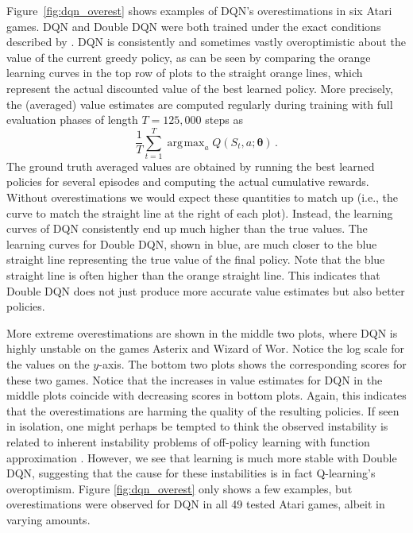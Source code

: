 \documentclass[letterpaper]{article}
\def\th{\bm\theta}
\DeclareMathOperator*{\argmax}{\arg\!\max}
\begin{document}
Figure~\ref{fig:dqn_overest} shows examples of DQN's overestimations in six Atari games. DQN and Double DQN were both trained under the exact conditions described by \citet{Mnih:2015}.  DQN is consistently and sometimes vastly overoptimistic about the value of the current greedy policy, as can be seen by comparing the orange learning curves in the top row of plots to the straight orange lines, which represent the actual discounted value of the best learned policy.  
More precisely, the (averaged) value estimates are computed regularly during training with full evaluation phases of length $T=125,000$ steps as
\[
\frac{1}{T} \sum_{t=1}^T \argmax_a Q( S_{t}, a ; \th) \,.
\]The ground truth averaged values are obtained by running the best learned policies for several episodes and computing the actual cumulative rewards.      
Without overestimations we would expect these quantities to match up (i.e., the curve to match the straight line at the right of each plot).  Instead, the learning curves of DQN consistently end up much higher than the true values.  The learning curves for Double DQN, shown in blue, are much closer to the blue straight line representing the true value of the final policy.  Note that the blue straight line is often higher than the orange straight line.  This indicates that Double DQN does not just produce more accurate value estimates but also better policies.

More extreme overestimations are shown in the middle two plots, where DQN is highly unstable on the games Asterix and Wizard of Wor.  Notice the log scale for the values on the $y$-axis.  The bottom two plots shows the corresponding scores for these two games.  Notice that the increases in value estimates for DQN in the middle plots coincide with decreasing scores in bottom plots.  Again, this indicates that the overestimations are harming the quality of the resulting policies.
If seen in isolation, one might perhaps be tempted to think the observed instability is related to inherent instability problems of off-policy learning with function approximation \citep{Baird:1995,Tsitsiklis:1997,Sutton:2008,Maei:2011,Sutton:2015}.  However, we see that learning is much more stable with Double DQN, suggesting that the cause for these instabilities is in fact Q-learning's overoptimism.
Figure \ref{fig:dqn_overest} only shows a few examples, but overestimations were observed for DQN in all 49 tested Atari games, albeit in varying amounts.
\end{document}
